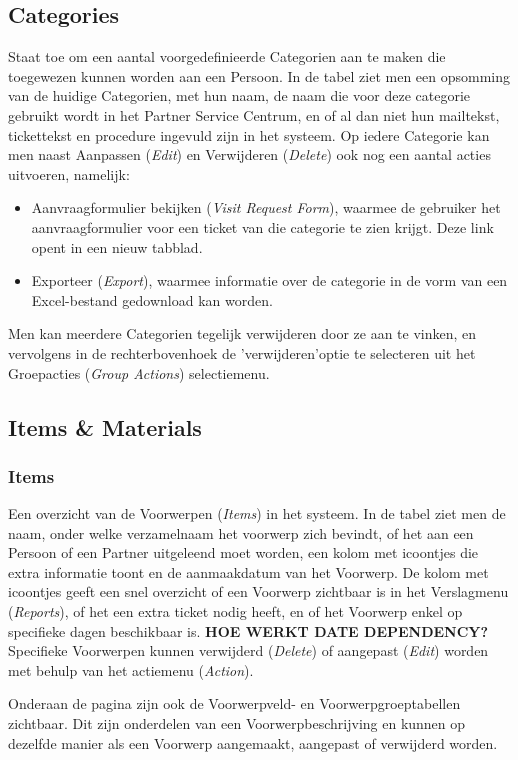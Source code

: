 \documentclass[]{memoir}
\begin{document}
\subsection{Categories} \label{Categories}
Staat toe om een aantal voorgedefinieerde Categorien aan te maken die toegewezen kunnen worden aan een Persoon.
In de tabel ziet men een opsomming van de huidige Categorien, met hun naam, de naam die voor deze categorie gebruikt wordt in het Partner Service Centrum, en of al dan niet hun mailtekst, tickettekst en procedure ingevuld zijn in het systeem.
Op iedere Categorie kan men naast Aanpassen (\textsl{Edit}) en Verwijderen (\textsl{Delete}) ook nog een aantal acties uitvoeren, namelijk:
\begin{itemize}
	\item Aanvraagformulier bekijken (\textsl{Visit Request Form}), waarmee de gebruiker het aanvraagformulier voor een ticket van die categorie te zien krijgt. Deze link opent in een nieuw tabblad.
	\item Exporteer (\textsl{Export}), waarmee informatie over de categorie in de vorm van een Excel-bestand gedownload kan worden.
\end{itemize}
Men kan meerdere Categorien tegelijk verwijderen door ze aan te vinken, en vervolgens in de rechterbovenhoek de 'verwijderen'optie te selecteren uit het Groepacties  (\textsl{Group Actions}) selectiemenu.

\subsection{Items \& Materials} \label{ItAndMats}
\subsubsection{Items} \label{Items}
Een overzicht van de Voorwerpen (\textsl{Items}) in het systeem. In de tabel ziet men de naam, onder welke verzamelnaam het voorwerp zich bevindt, of het aan een Persoon of een Partner uitgeleend moet worden, een kolom met icoontjes die extra informatie toont en de aanmaakdatum van het Voorwerp.
De kolom met icoontjes geeft een snel overzicht of een Voorwerp zichtbaar is in het Verslagmenu (\textsl{Reports}), of het een extra ticket nodig heeft, en of het Voorwerp enkel op specifieke dagen beschikbaar is.
\textbf{HOE WERKT DATE DEPENDENCY?}
Specifieke Voorwerpen kunnen verwijderd (\textsl{Delete}) of aangepast (\textsl{Edit}) worden met behulp van het actiemenu (\textsl{Action}).

Onderaan de pagina zijn ook de Voorwerpveld- en Voorwerpgroeptabellen zichtbaar. Dit zijn onderdelen van een Voorwerpbeschrijving en kunnen op dezelfde manier als een Voorwerp aangemaakt, aangepast of verwijderd worden.
\end{document}
